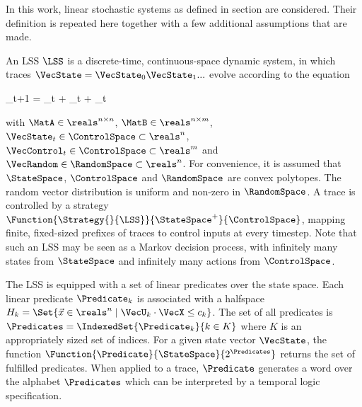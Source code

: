 In this work, linear stochastic systems as defined in section  are considered.
Their definition is repeated here together with a few additional assumptions that are made.

An LSS $\LSS$ is a discrete-time, continuous-space dynamic system, in which traces $\VecState = \VecState_0 \VecState_1 ...$ evolve according to the equation

\startformula
    \VecState_{t+1} = \MatA \VecState_t + \MatB \VecControl_t + \VecRandom_t \EndComma
\stopformula

with $\MatA \in \reals^{n \times n}$, $\MatB \in \reals^{n \times m}$, $\VecState_t \in \ControlSpace \subset \reals^n$, $\VecControl_t \in \ControlSpace \subset \reals^m$ and $\VecRandom \in \RandomSpace \subset \reals^n$.
For convenience, it is assumed that $\StateSpace$, $\ControlSpace$ and $\RandomSpace$ are convex polytopes.
The random vector distribution is uniform and non-zero in $\RandomSpace$.
A trace is controlled by a strategy $\Function{\Strategy{}{\LSS}}{\StateSpace^+}{\ControlSpace}$, mapping finite, fixed-sized prefixes of traces to control inputs at every timestep.
Note that such an LSS may be seen as a Markov decision process, with infinitely many states from $\StateSpace$ and infinitely many actions from $\ControlSpace$.

The LSS is equipped with a set of linear predicates over the state space.
Each linear predicate $\Predicate_k$ is associated with a halfspace $H_k = \Set{ \Vec{x} \in \reals^n \mid \VecU_k \cdot \VecX \leq c_k }$.
The set of all predicates is $\Predicates = \IndexedSet{\Predicate_k}{k \in K}$ where $K$ is an appropriately sized set of indices.
For a given state vector $\VecState$, the function $\Function{\Predicate}{\StateSpace}{2^\Predicates}$ returns the set of fulfilled predicates.
When applied to a trace, $\Predicate$ generates a word over the alphabet $\Predicates$ which can be interpreted by a temporal logic specification.


